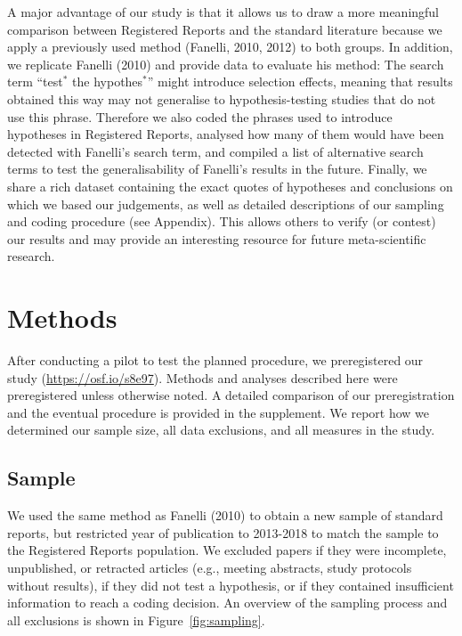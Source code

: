 \documentclass[british,,jou,floatsintext]{apa6}
\begin{document}
A major advantage of our study is that it allows us to draw a more meaningful comparison between Registered Reports and the standard literature because we apply a previously used method (Fanelli, 2010, 2012) to both groups.
In addition, we replicate Fanelli (2010) and provide data to evaluate his method: The search term \enquote{test\(^\ast\) the hypothes\(^\ast\)} might introduce selection effects, meaning that results obtained this way may not generalise to hypothesis-testing studies that do not use this phrase.
Therefore we also coded the phrases used to introduce hypotheses in Registered Reports, analysed how many of them would have been detected with Fanelli's search term, and compiled a list of alternative search terms to test the generalisability of Fanelli's results in the future.
Finally, we share a rich dataset containing the exact quotes of hypotheses and conclusions on which we based our judgements, as well as detailed descriptions of our sampling and coding procedure (see Appendix).
This allows others to verify (or contest) our results and may provide an interesting resource for future meta-scientific research.

\hypertarget{methods}{%
\section{Methods}\label{methods}}

After conducting a pilot to test the planned procedure, we preregistered our study (\url{https://osf.io/s8e97}).
Methods and analyses described here were preregistered unless otherwise noted.
A detailed comparison of our preregistration and the eventual procedure is provided in the supplement.
We report how we determined our sample size, all data exclusions, and all measures in the study.

\hypertarget{sample}{%
\subsection{Sample}\label{sample}}

We used the same method as Fanelli (2010) to obtain a new sample of standard reports, but restricted year of publication to 2013-2018 to match the sample to the Registered Reports population.
We excluded papers if they were incomplete, unpublished, or retracted articles (e.g., meeting abstracts, study protocols without results), if they did not test a hypothesis, or if they contained insufficient information to reach a coding decision.
An overview of the sampling process and all exclusions is shown in Figure~\ref{fig:sampling}.
\end{document}

